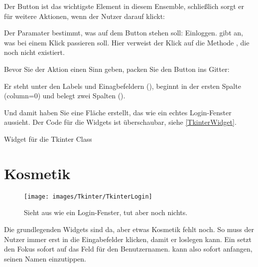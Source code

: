 Der Button ist das wichtigste Element in diesem Ensemble, schließlich sorgt er für weitere Aktionen, wenn der Nutzer darauf klickt:

\medskip


\medskip

Der Paramater  bestimmt, was auf dem Button stehen soll: Einloggen.  gibt an, was bei einem Klick passieren soll. Hier verweist der Klick auf die Methode , die noch nicht existiert.

Bevor Sie der Aktion einen Sinn geben, packen Sie den Button ins Gitter:

\medskip


\medskip

Er steht unter den Labels und Einagbefeldern (), beginnt in der ersten Spalte (column=0) und belegt zwei Spalten ().

Und damit haben Sie eine Fläche erstellt, das wie ein echtes Login-Fenster aussieht. Der Code für die Widgets ist überschaubar, siehe \ref{TkinterWidget}.


\begin{code}
     
    \caption{Widget für die Tkinter Class}\label{TkinterWidget}
\end{code}   


\section{Kosmetik}

\begin{figure}
    \texttt{[image: images/Tkinter/TkinterLogin]}
    \caption{Sieht aus wie ein Login-Fenster, tut aber noch nichts.} \label{TkinterLogin}
\end{figure}


Die grundlegenden Widgets sind da, aber etwas Kosmetik fehlt noch. So muss der Nutzer immer erst in die Eingabefelder klicken, damit er loslegen kann. Ein  setzt den Fokus sofort auf das Feld für den Benutzernamen.  kann also sofort anfangen, seinen Namen einzutippen.

